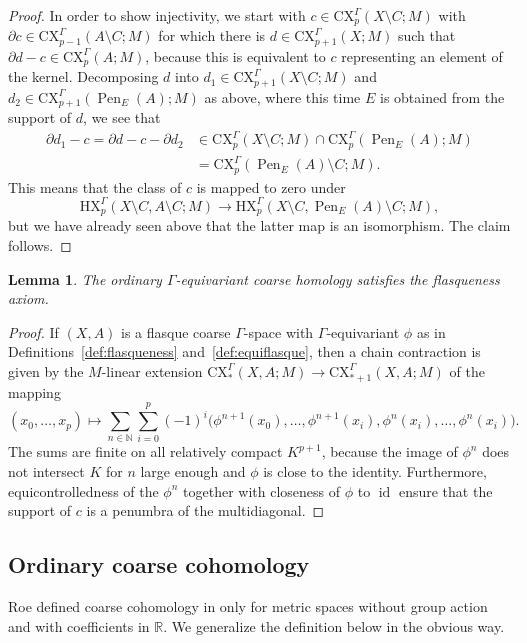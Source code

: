 \documentclass[pdftex]{sigma}
\numberwithin{equation}{section}
\newtheorem{lem}[thm]{Lemma}
\theoremstyle{definition}
\newcommand{\N}{\mathbb{N}}
\newcommand{\R}{\mathbb{R}}
\DeclareMathOperator{\id}{id}
\DeclareMathOperator{\Pen}{Pen}
\newcommand{\HX}{\mathrm{HX}}
\newcommand{\CX}{\mathrm{CX}}
\begin{document}
\begin{proof}
In order to show injectivity, we start with $c\in\CX^\Gamma_p(X\setminus C;M)$ with $\partial c\in \CX^\Gamma_{p-1}(A\setminus C;M)$ for which there is $d\in \CX^\Gamma_{p+1}(X;M)$ such that $\partial d-c\in\CX^\Gamma_p(A;M)$, because this is equivalent to $c$ representing an element of the kernel. Decomposing $d$ into $d_1\in\CX^\Gamma_{p+1}(X\setminus C;M)$ and $d_2\in \CX^\Gamma_{p+1}(\Pen_E(A);M)$ as above, where this time $E$ is obtained from the support of $d$, we see that
\begin{align*}
\partial d_1-c=\partial d-c-\partial d_2&\in \CX^\Gamma_p(X\setminus C;M)\cap\CX^\Gamma_p(\Pen_E(A);M)
\\&=\CX^\Gamma_p(\Pen_E(A)\setminus C;M).
\end{align*}
This means that the class of $c$ is mapped to zero under
\[
\HX^\Gamma_p(X\setminus C,A\setminus C;M)\to\HX^\Gamma_p(X\setminus C,\Pen_E(A)\setminus C;M),
\]
but we have already seen above that the latter map is an isomorphism. The claim follows.
\end{proof}

\begin{lem}\label{lem:ordinarystronghomologyflasqueness}
The ordinary $\Gamma$-equivariant coarse homology satisfies the flasqueness axiom.
\end{lem}
\begin{proof}
If $(X,A)$ is a flasque coarse $\Gamma$-space with $\Gamma$-equivariant $\phi$ as in Definitions~\ref{def:flasqueness} and~\ref{def:equiflasque}, then a chain contraction is given by
the $M$-linear extension $\CX^\Gamma_*(X,A;M)\to\CX^\Gamma_{*+1}(X,A;M)$ of the mapping
\[
(x_0,\dots,x_p)\mapsto\sum_{n\in\N}\sum_{i=0}^p(-1)^i\big(\phi^{n+1}(x_0),\dots,\phi^{n+1}(x_i), \phi^{n}(x_i),\dots,\phi^{n}(x_i)\big).
\]
The sums are finite on all relatively compact $K^{p+1}$, because the image of $\phi^n$ does not intersect $K$ for $n$ large enough and $\phi$ is close to the identity. Furthermore, equicontrolledness of the $\phi^n$ together with closeness of $\phi$ to $\id$ ensure that the support of $c$ is a penumbra of the multidiagonal.
\end{proof}

\subsection{Ordinary coarse cohomology}
\label{sec:ordinarycoarsecohomology}

Roe defined coarse cohomology in \cite{RoeCoarseCohomIndexTheory} only for metric spaces without group action and with coefficients in $\R$.
We generalize the definition below in the obvious way.
\end{document}
